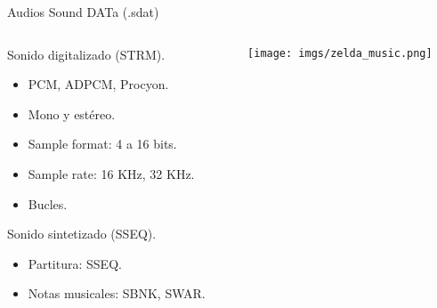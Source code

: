 \begin{frame}{Audios}
    \centering{}Sound DATa (.sdat) \\ \vspace{5pt}
    \begin{columns}
    \begin{column}{0.6\textwidth}
        \begin{wideitemize}
            \item<+-> Sonido digitalizado (STRM).
            \begin{itemize}
                \item PCM, ADPCM, Procyon.
                \item Mono y estéreo.
                \item Sample format: 4 a 16 bits.
                \item Sample rate: 16 KHz, 32 KHz.
                \item Bucles.
            \end{itemize}
            \item<+-> Sonido sintetizado (SSEQ).
            \begin{itemize}
                \item Partitura: SSEQ.
                \item Notas musicales: SBNK, SWAR.
            \end{itemize}
        \end{wideitemize}
    \end{column}
    \begin{column}{0.5\textwidth}
        \texttt{[image: imgs/zelda\_music.png]}
    \end{column}
    \end{columns}
\end{frame}
